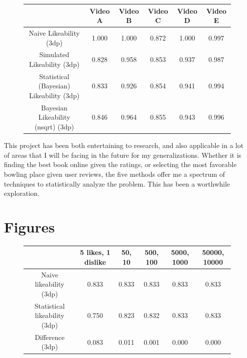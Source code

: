 \documentclass[a4paper,11pt]{article}
\begin{document}
\begin{figure}[H]
    \centering
    \begin{tabular}{c|c|c|c|c|c}
        & Video A & Video B & Video C & Video D & Video E \\
        \hline
        \hline
         Naive Likeability (3dp) & 1.000 & 1.000 & 0.872 & 1.000 & 0.997\\ \hline
         Simulated Likeability (3dp) & 0.828 & 0.958 &  0.853 & 0.937 & 0.987\\ \hline
         Statistical (Bayesian) Likeability (3dp) & 0.833 & 0.926 & 0.854 & 0.941 & 0.994\\ \hline
        Bayesian Likeability (nsqrt) (3dp) & 0.846 & 0.964 & 0.855 & 0.943 & 0.996
    \end{tabular}
    \label{tbl:all}
\end{figure}

This project has been both entertaining to research, and also applicable in a lot of areas that I will be facing in the future for my generalizations. Whether it is finding the best book online given the ratings, or selecting the most favorable bowling place given user reviews, the five methods offer me a spectrum of techniques to statistically analyze the problem. This has been a worthwhile exploration.

\newpage
\printbibliography


\newpage
\appendix
{}
\section{Figures}

\begin{figure}[H]
    \centering
    \begin{tabular}{c|c|c|c|c|c}
        & 5 likes, 1 dislike & 50, 10 & 500, 100 & 5000, 1000 & 50000, 10000 \\
        \hline
        \hline
        Naive likeability (3dp) & 0.833 & 0.833 & 0.833 & 0.833 & 0.833\\ \hline
        Statistical likeability (3dp) & 0.750 & 0.823 & 0.832 & 0.833 & 0.833\\ \hline
        Difference (3dp) & 0.083 & 0.011 & 0.001 & 0.000 & 0.000
    \end{tabular}
    \label{apd:acc}
\end{figure}
\end{document}
